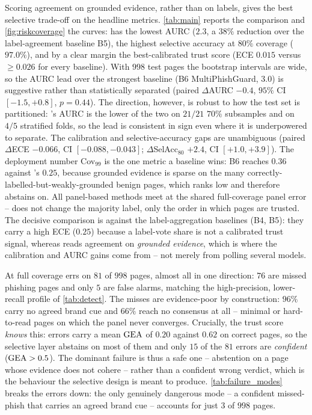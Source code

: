 Scoring agreement on grounded evidence, rather than on labels, gives the best selective
trade-off on the headline metrics. \autoref{tab:main} reports the comparison and
\autoref{fig:riskcoverage} the curves: \toolname{} has the lowest AURC ($2.3$, a
$38\%$ reduction over the label-agreement baseline B5), the highest selective accuracy
at $80\%$ coverage ($97.0\%$), and by a clear margin the best-calibrated trust score
(ECE $0.015$ versus $\ge0.026$ for every baseline). With $998$ test pages the bootstrap
intervals are wide, so the AURC lead over the strongest baseline (B6 MultiPhishGuard,
$3.0$) is suggestive rather than statistically separated (paired $\Delta$AURC $-0.4$, $95\%$
CI $[-1.5,+0.8]$, $p=0.44$). The direction, however, is robust to how the test set is
partitioned: \toolname's AURC is the lower of the two on $21/21$ $70\%$ subsamples and on
$4/5$ stratified folds, so the lead is consistent in sign even where it is underpowered to
separate. The calibration and selective-accuracy gaps are
unambiguous (paired $\Delta$ECE $-0.066$, CI $[-0.088,-0.043]$; $\Delta$SelAcc$_{80}$
$+2.4$, CI $[+1.0,+3.9]$). The deployment number Cov$_{99}$ is the one metric a baseline wins:
B6 reaches $0.36$ against \toolname's $0.25$, because grounded evidence is sparse on the
many correctly-labelled-but-weakly-grounded benign pages, which \toolname{} ranks low
and therefore abstains on. All panel-based methods meet at the shared full-coverage
panel error -- \toolname{} does not change the majority label, only the order in which
pages are trusted. The decisive comparison is against the label-aggregation baselines
(B4, B5): they carry a high ECE ($0.25$) because a label-vote share is not a calibrated
trust signal, whereas \toolname{} reads agreement on \emph{grounded evidence}, which is
where the calibration and AURC gains come from -- not merely from polling several models.



At full coverage \toolname{} errs on $81$ of $998$ pages, almost all in one direction:
$76$ are missed phishing pages and only $5$ are false alarms, matching the high-precision,
lower-recall profile of \autoref{tab:detect}. The misses are evidence-poor by construction:
$96\%$ carry no agreed brand cue and $66\%$ reach no consensus at all -- minimal or
hard-to-read pages on which the panel never converges. Crucially, the trust score
\emph{knows} this: errors carry a mean $\mathrm{GEA}$ of $0.20$ against $0.62$ on correct pages,
so the selective layer abstains on most of them and only $15$ of the $81$ errors are
\emph{confident} ($\mathrm{GEA}>0.5$). The dominant failure is thus a safe one -- abstention on
a page whose evidence does not cohere -- rather than a confident wrong verdict, which is the
behaviour the selective design is meant to produce. \autoref{tab:failure_modes} breaks the
errors down: the only genuinely dangerous mode -- a confident missed-phish that carries an
agreed brand cue -- accounts for just $3$ of $998$ pages.


